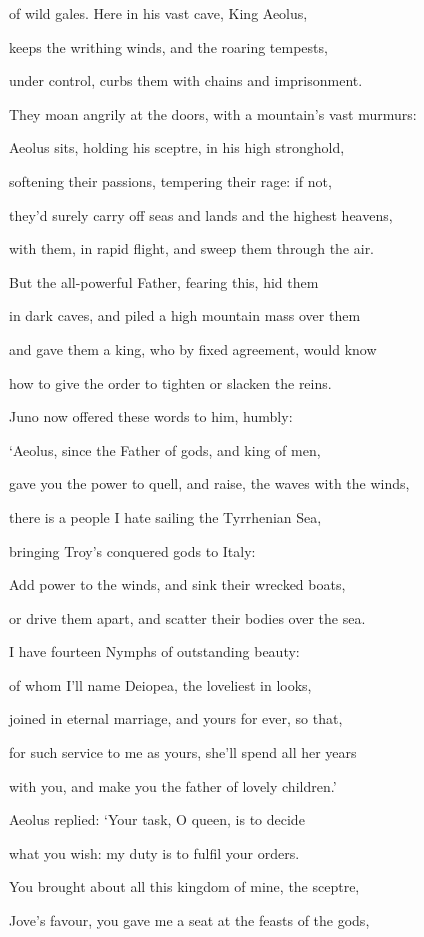 \documentclass[12pt, a5paper]{minimal}
\begin{document}
of wild gales. Here in his vast cave, King Aeolus,

keeps the writhing winds, and the roaring tempests,

under control, curbs them with chains and imprisonment.

They moan angrily at the doors, with a mountain’s vast murmurs:

Aeolus sits, holding his sceptre, in his high stronghold,

softening their passions, tempering their rage: if not,

they’d surely carry off seas and lands and the highest heavens,

with them, in rapid flight, and sweep them through the air.

But the all-powerful Father, fearing this, hid them

in dark caves, and piled a high mountain mass over them

and gave them a king, who by fixed agreement, would know

how to give the order to tighten or slacken the reins.

Juno now offered these words to him, humbly:

‘Aeolus, since the Father of gods, and king of men,

gave you the power to quell, and raise, the waves with the winds,

there is a people I hate sailing the Tyrrhenian Sea,

bringing Troy’s conquered gods to Italy:

Add power to the winds, and sink their wrecked boats,

or drive them apart, and scatter their bodies over the sea.

I have fourteen Nymphs of outstanding beauty:

of whom I’ll name Deiopea, the loveliest in looks,

joined in eternal marriage, and yours for ever, so that,

for such service to me as yours, she’ll spend all her years

with you, and make you the father of lovely children.’

Aeolus replied: ‘Your task, O queen, is to decide

what you wish: my duty is to fulfil your orders.

You brought about all this kingdom of mine, the sceptre,

Jove’s favour, you gave me a seat at the feasts of the gods,
\end{document}

